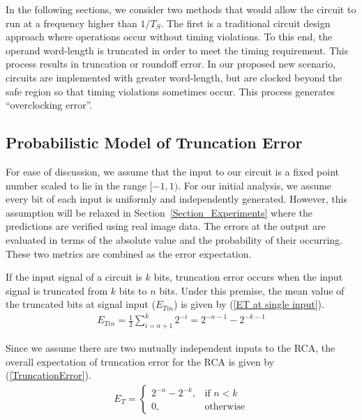 \documentclass[journal]{IEEEtran}
\begin{document}
In the following sections, we consider two methods that would allow the circuit to run at a frequency higher than $1/{T_S}$. The first is a traditional circuit design approach where operations occur without timing violations. To this end, the operand word-length is truncated in order to meet the timing requirement. This process results in truncation or roundoff error. In our proposed new scenario, circuits are implemented with greater word-length, but are clocked beyond the safe region so that timing violations sometimes occur. This process generates ``overclocking error''.


\subsection{Probabilistic Model of Truncation Error}
For ease of discussion, we assume that the input to our circuit is a fixed point number scaled to lie in the range $[-1,1)$. For our initial analysis, we assume every bit of each input is uniformly and independently generated. However, this assumption will be relaxed in Section~\ref{Section_Experiments} where the predictions are verified using real image data. The errors at the output are evaluated in terms of the absolute value and the probability of their occurring. These two metrics are combined as the error expectation.

If the input signal of a circuit is $k$ bits, truncation error occurs when the input signal is truncated from $k$ bits to $n$ bits. Under this premise, the mean value of the truncated bits at signal input ($E_{Tin}$) is given by (\ref{ET at single input}).
%
\begin{eqnarray}\label{ET at single input}
  E_{Tin}=\frac{1}{2}\sum_{i=n+1}^{k}2^{-i}=2^{-n-1}-2^{-k-1}
\end{eqnarray}

Since we assume there are two mutually independent inputs to the RCA, the overall expectation of truncation error for the RCA is given by (\ref{TruncationError}).
%
\begin{eqnarray}\label{TruncationError}
  E_T=\left\{
    \begin{matrix}
        2^{-n}-2^{-k}, & \textrm{if $n<k$}\\
        0, & \textrm{otherwise}
    \end{matrix}
  \right.
\end{eqnarray}
\end{document}
